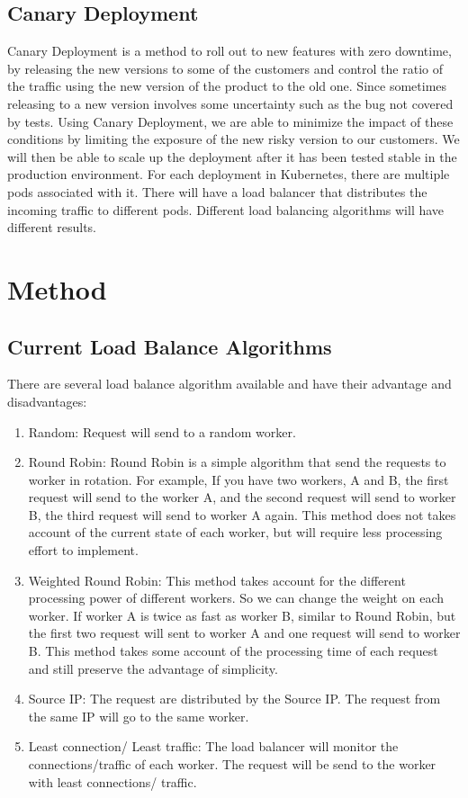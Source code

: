 \documentclass{article}
\begin{document}
\subsection{Canary Deployment}
Canary Deployment is a method to roll out to new features with zero downtime, by releasing the new versions to some of the customers and control the ratio of the traffic using the new version of the product to the old one. Since sometimes releasing to a new version involves some uncertainty such as the bug not covered by tests. Using Canary Deployment, we are able to minimize the impact of these conditions by limiting the exposure of the new risky version to our customers. We will then be able to scale up the deployment after it has been tested stable in the production environment. For each deployment in Kubernetes, there are multiple pods associated with it. There will have a load balancer that distributes the incoming traffic to different pods. Different load balancing algorithms will have different results.

\section{Method}
\subsection{Current Load Balance Algorithms}
There are several load balance algorithm available and have their advantage and disadvantages:
\begin{enumerate}
    \item Random: Request will send to a random worker.
    \item Round Robin: Round Robin is a simple algorithm that send the requests to worker in rotation. For example, If you have two workers, A and B, the first request will send to the worker A, and the second request will send to worker B, the third request will send to worker A again. This method does not takes account of the current state of each worker, but will require less processing effort to implement.
    
    \item Weighted Round Robin: This method takes account for the different processing power of different workers. So we can change the weight on each worker. If worker A is twice as fast as worker B, similar to Round Robin, but the first two request will sent to worker A and one request will send to worker B. This method takes some account of the processing time of each request and still preserve the advantage of simplicity. 
    
    \item Source IP: The request are distributed by the Source IP. The request from the same IP will go to the same worker. 
    \item Least connection/ Least traffic: The load balancer will monitor the connections/traffic of each worker. The request will be send to the worker with least connections/ traffic.
\end{enumerate}
\end{document}
